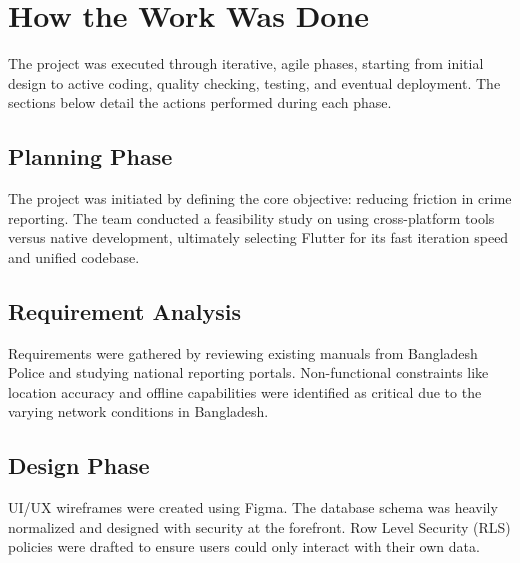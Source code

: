 \documentclass[12pt, a4paper, twoside, openany]{report}
\begin{document}
\section{How the Work Was Done}
The project was executed through iterative, agile phases, starting from initial design to active coding, quality checking, testing, and eventual deployment. The sections below detail the actions performed during each phase.

\subsection{Planning Phase}
The project was initiated by defining the core objective: reducing friction in crime reporting. The team conducted a feasibility study on using cross-platform tools versus native development, ultimately selecting Flutter for its fast iteration speed and unified codebase.

\subsection{Requirement Analysis}
Requirements were gathered by reviewing existing manuals from Bangladesh Police and studying national reporting portals. Non-functional constraints like location accuracy and offline capabilities were identified as critical due to the varying network conditions in Bangladesh.

\subsection{Design Phase}
UI/UX wireframes were created using Figma. The database schema was heavily normalized and designed with security at the forefront. Row Level Security (RLS) policies were drafted to ensure users could only interact with their own data.
\end{document}
